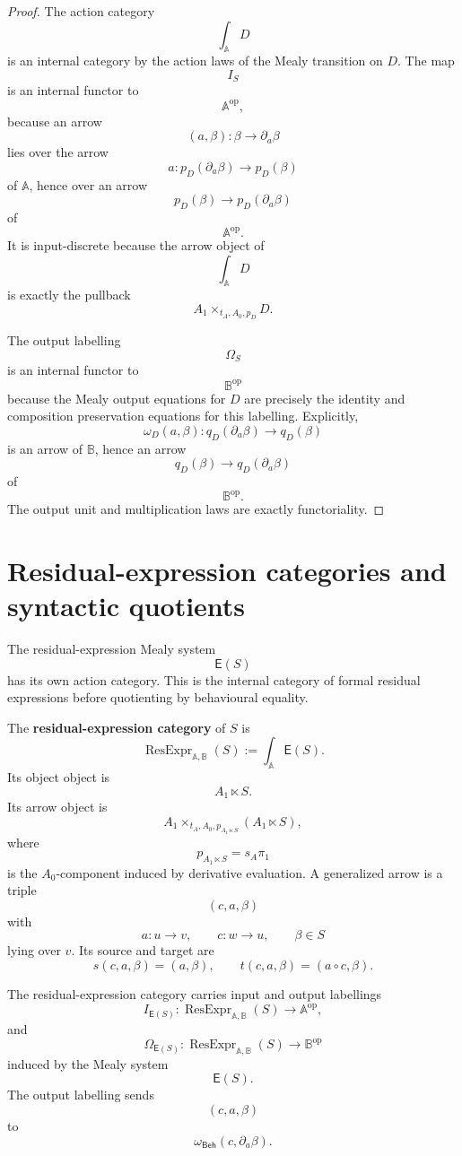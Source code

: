 \begin{proof}
The action category
\[
\int_{\mathbb A}D
\]
is an internal category by the action laws of the Mealy transition on \(D\).
The map
\[
I_S
\]
is an internal functor to
\[
\mathbb A^{\mathrm{op}},
\]
because an arrow
\[
(a,\beta):\beta\to\partial_a\beta
\]
lies over the arrow
\[
a:p_D(\partial_a\beta)\to p_D(\beta)
\]
of \(\mathbb A\), hence over an arrow
\[
p_D(\beta)\to p_D(\partial_a\beta)
\]
of
\[
\mathbb A^{\mathrm{op}}.
\]
It is input-discrete because the arrow object of
\[
\int_{\mathbb A}D
\]
is exactly the pullback
\[
A_1\times_{t_A,A_0,p_D}D.
\]

The output labelling
\[
\Omega_S
\]
is an internal functor to
\[
\mathbb B^{\mathrm{op}}
\]
because the Mealy output equations for \(D\) are precisely the identity and
composition preservation equations for this labelling. Explicitly,
\[
\omega_D(a,\beta):
q_D(\partial_a\beta)\to q_D(\beta)
\]
is an arrow of \(\mathbb B\), hence an arrow
\[
q_D(\beta)\to q_D(\partial_a\beta)
\]
of
\[
\mathbb B^{\mathrm{op}}.
\]
The output unit and multiplication laws are exactly functoriality.
\end{proof}

\section{Residual-expression categories and syntactic quotients}
\label{sec:residual-expression-categories-syntactic-quotients}

The residual-expression Mealy system
\[
\mathsf E(S)
\]
has its own action category. This is the internal category of formal residual
expressions before quotienting by behavioural equality.

\begin{definition}
\label{def:residual-expression-category}
The \textbf{residual-expression category} of \(S\) is
\[
\operatorname{ResExpr}_{\mathbb A,\mathbb B}(S)
:=
\int_{\mathbb A}\mathsf E(S).
\]
Its object object is
\[
A_1\ltimes S.
\]
Its arrow object is
\[
A_1\times_{t_A,A_0,p_{A_1\ltimes S}}(A_1\ltimes S),
\]
where
\[
p_{A_1\ltimes S}=s_A\pi_1
\]
is the \(A_0\)-component induced by derivative evaluation.
A generalized arrow is a triple
\[
(c,a,\beta)
\]
with
\[
a:u\to v,
\qquad
c:w\to u,
\qquad
\beta\in S
\]
lying over \(v\). Its source and target are
\[
s(c,a,\beta)=(a,\beta),
\qquad
t(c,a,\beta)=(a\circ c,\beta).
\]
\end{definition}

The residual-expression category carries input and output labellings
\[
I_{\mathsf E(S)}:
\operatorname{ResExpr}_{\mathbb A,\mathbb B}(S)
\to
\mathbb A^{\mathrm{op}},
\]
and
\[
\Omega_{\mathsf E(S)}:
\operatorname{ResExpr}_{\mathbb A,\mathbb B}(S)
\to
\mathbb B^{\mathrm{op}}
\]
induced by the Mealy system
\[
\mathsf E(S).
\]
The output labelling sends
\[
(c,a,\beta)
\]
to
\[
\omega_{\mathsf{Beh}}(c,\partial_a\beta).
\]

